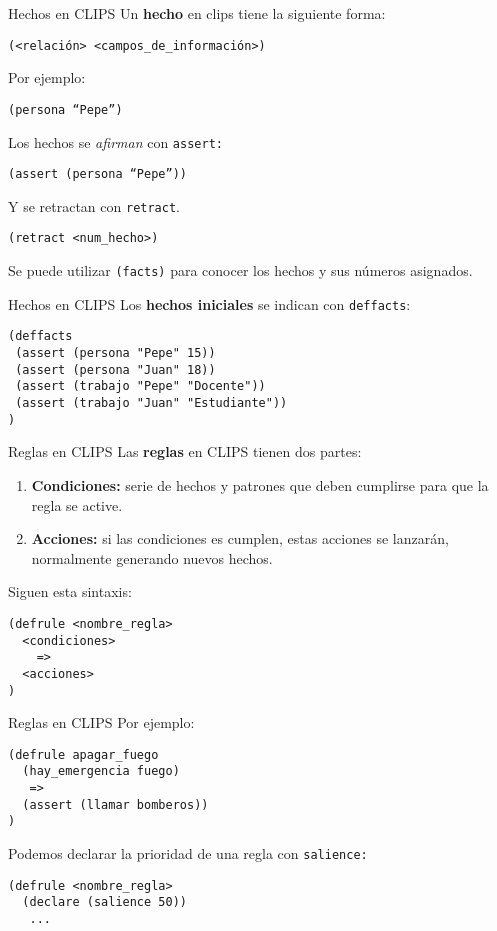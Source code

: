 \documentclass[smaller,spanish,xcolor=svgnames]{beamer}
\begin{document}
\begin{frame}{Hechos en CLIPS}
Un \textbf{hecho} en clips tiene la siguiente forma:

\texttt{(<relación> <campos\_de\_información>)}

\bigskip

Por ejemplo:

\texttt{(persona ``Pepe'')}

\bigskip

Los hechos se \textit{afirman} con \texttt{assert:}

\texttt{(assert (persona ``Pepe''))}

\bigskip

Y se retractan con \texttt{retract}. 

\texttt{(retract <num\_hecho>)}

\medskip

Se puede utilizar \texttt{(facts)} para conocer los hechos y sus números
asignados.
  
\end{frame}

\begin{frame}[fragile]{Hechos en CLIPS}
Los \textbf{hechos iniciales} se indican con \texttt{deffacts}:
\begin{verbatim}
(deffacts
 (assert (persona "Pepe" 15))
 (assert (persona "Juan" 18))
 (assert (trabajo "Pepe" "Docente"))
 (assert (trabajo "Juan" "Estudiante"))
)
\end{verbatim}  
\end{frame}

\begin{frame}[fragile]{Reglas en CLIPS}
  Las \textbf{reglas} en CLIPS tienen dos partes:
  \begin{enumerate}
  \item \textbf{Condiciones:} serie de hechos y patrones que deben cumplirse
    para que la regla se active.
  \item \textbf{Acciones:} si las condiciones es cumplen, estas acciones se
    lanzarán, normalmente generando nuevos hechos.
  \end{enumerate}

\bigskip

Siguen esta sintaxis:
\begin{verbatim}
(defrule <nombre_regla>
  <condiciones>
    =>
  <acciones>
)
\end{verbatim}
\end{frame}

\begin{frame}[fragile]{Reglas en CLIPS}
Por ejemplo:
\begin{verbatim}
(defrule apagar_fuego
  (hay_emergencia fuego)
   =>
  (assert (llamar bomberos))
)
\end{verbatim}  

Podemos declarar la prioridad de una regla con \texttt{salience:}

\begin{verbatim}
(defrule <nombre_regla>
  (declare (salience 50))
   ...
\end{verbatim}    
\end{frame}
\end{document}
